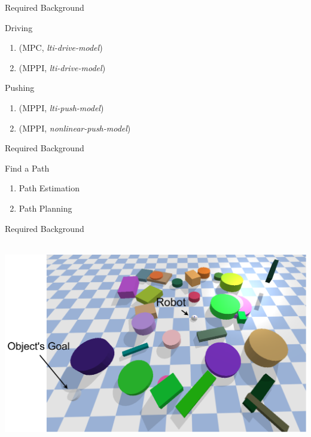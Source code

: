 \begin{frame}[fragile]{Required Background} 
\begin{block}{Driving}
\begin{enumerate}
  \item (MPC, \textit{lti-drive-model})
  \item (MPPI, \textit{lti-drive-model})
\end{enumerate}
\end{block}\pause

\begin{block}{Pushing}
\begin{enumerate}
  \item (MPPI, \textit{lti-push-model})
  \item (MPPI, \textit{nonlinear-push-model})
\end{enumerate}
\end{block}
\end{frame}

\begin{frame}[fragile]{Required Background} 
\begin{block}{Find a Path}
\begin{enumerate}
  \item Path Estimation\\
  \item Path Planning\\
\end{enumerate}
\end{block}
\end{frame}

\begin{frame}[fragile]{Required Background} 
  \begin{center}
    \hbox{\hspace{-1.5em} \includegraphics[height=0.85\textheight]{figures/required_background/is_there_a_path}}
  \end{center}
\end{frame}

